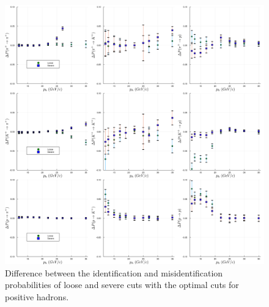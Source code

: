 \begin{figure}[!p]
	\centering
	\includegraphics[scale=0.1]{./gfx/SysPlus.png}
	\caption{Difference between the identification and misidentification probabilities of loose and severe cuts with the optimal cuts for positive hadrons.}
	\label{pic:Sysplus}
\end{figure}

